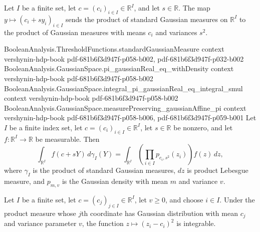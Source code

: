 \begin{lemma}
\leanok
{}
Let $I$ be a finite set, let $c=(c_i)_{i\in I}\in\mathbb R^I$, and let $s\in\mathbb R$.
The map $y\mapsto(c_i+s y_i)_{i\in I}$ sends the product of standard Gaussian measures
on $\mathbb R^I$ to the product of Gaussian measures with means $c_i$ and variances
$s^2$.
\end{lemma}

\begin{lemma}
\leanok
{}
\proofstep
  {BooleanAnalysis.ThresholdFunctions.standardGaussianMeasure}
  {context}
  {vershynin-hdp-book}
  {pdf-681b6f3d947f-p058-b002,
    pdf-681b6f3d947f-p032-b002}
\proofstep
  {BooleanAnalysis.GaussianSpace.pi_gaussianReal_eq_withDensity}
  {context}
  {vershynin-hdp-book}
  {pdf-681b6f3d947f-p058-b002}
\proofstep
  {BooleanAnalysis.GaussianSpace.integral_pi_gaussianReal_eq_integral_smul}
  {context}
  {vershynin-hdp-book}
  {pdf-681b6f3d947f-p058-b002}
\proofstep
  {BooleanAnalysis.GaussianSpace.measurePreserving_gaussianAffine_pi}
  {context}
  {vershynin-hdp-book}
  {pdf-681b6f3d947f-p058-b006,
    pdf-681b6f3d947f-p059-b001}
Let $I$ be a finite index set, let $c=(c_i)_{i\in I}\in\mathbb R^I$, let $s\in\mathbb R$
be nonzero, and let $f:\mathbb R^I\to\mathbb R$ be measurable. Then
\[
\int_{\mathbb R^I} f(c+sY)\,d\gamma_I(Y)=\int_{\mathbb R^I}\left(\prod_{i\in I}
p_{c_i,s^2}(z_i)\right)f(z)\,dz,
\]
where $\gamma_I$ is the product of standard Gaussian measures, $dz$ is product Lebesgue
measure, and $p_{m,v}$ is the Gaussian density with mean $m$ and variance $v$.
\end{lemma}

\begin{lemma}
\leanok
{}
Let $I$ be a finite set, let $c=(c_j)_{j\in I}\in\mathbb R^I$, let $v\ge0$, and choose
$i\in I$. Under the product measure whose $j$th coordinate has Gaussian distribution
with mean $c_j$ and variance parameter $v$, the function $z\mapsto(z_i-c_i)^2$ is
integrable.
\end{lemma}

